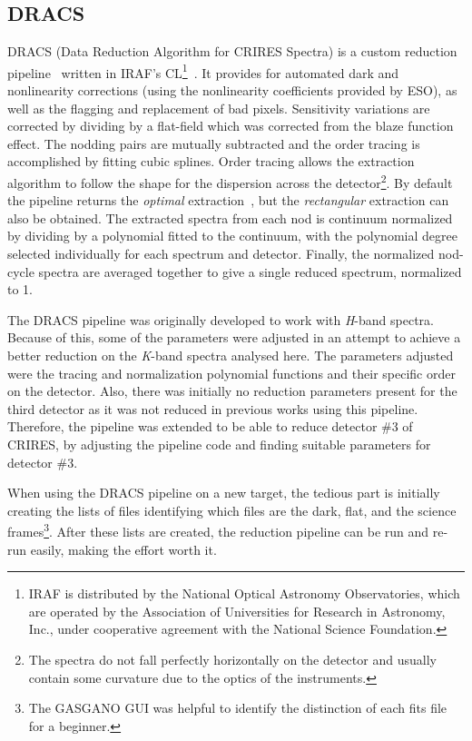 \subsection{{DRACS}}
\label{subsec:dracs}
{DRACS} (Data Reduction Algorithm for {CRIRES} Spectra) is a custom reduction pipeline~\citep{figueira_radial_2010} written in {IRAF}'s CL\footnote{{IRAF} is distributed by the National Optical Astronomy Observatories, which are operated by the Association of Universities for Research in Astronomy, {Inc.}, under cooperative agreement with the National Science Foundation.}~\citep{tody_iraf_1993}.
It provides for automated dark and nonlinearity corrections (using the nonlinearity coefficients provided by {ESO}), as well as the flagging and replacement of bad pixels.
Sensitivity variations are corrected by dividing by a flat-field which was corrected from the blaze function effect.
The nodding pairs are mutually subtracted and the order tracing is accomplished by fitting cubic splines.
Order tracing allows the extraction algorithm to follow the shape for the dispersion across the detector\footnote{The spectra do not fall perfectly horizontally on the detector and usually contain some curvature due to the optics of the instruments.}.
By default the pipeline returns the \emph{optimal} extraction~\citep{horne_optimal_1986}, but the \emph{rectangular} extraction can also be obtained.
The extracted spectra from each nod is continuum normalized by dividing by a polynomial fitted to the continuum, with the polynomial degree selected individually for each spectrum and detector.
Finally, the normalized nod-cycle spectra are averaged together to give a single reduced spectrum, normalized to 1.

The {DRACS} pipeline was originally developed to work with \emph{H}-band spectra.
Because of this, some of the parameters were adjusted in an attempt to achieve a better reduction on the \emph{K}-band spectra analysed here.
The parameters adjusted were the tracing and normalization polynomial functions and their specific order on the detector.
Also, there was initially no reduction parameters present for the third detector as it was not reduced in previous works using this pipeline.
Therefore, the pipeline was extended to be able to reduce detector \#3 of CRIRES, by adjusting the pipeline code and finding suitable parameters for detector \#3.

When using the {DRACS} pipeline on a new target, the tedious part is initially creating the lists of files identifying which files are the dark, flat, and the science frames\footnote{The {GASGANO} {GUI} was helpful to identify the distinction of each fits file for a beginner.}.
After these lists are created, the reduction pipeline can be run and re-run easily, making the effort worth it.

